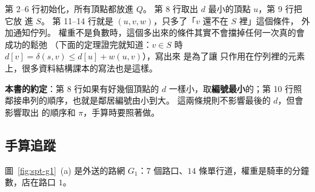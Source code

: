 第 2--6 行初始化，所有頂點都放進 $Q$。 第 8 行取出 $d$ 最小的頂點 $u$，第 9 行把它放
進 $S$。 第 11--14 行就是 $(u, v, w)$，只多了「$v$ 還不在 $S$ 裡」這個條件，
外加通知佇列。 權重不是負數時，這個多出來的條件其實不會擋掉任何一次真的會成功的鬆弛
（下面的定理證完就知道：$v \in S$ 時 $d[v] = \delta(s, v) \le d[u] + w(u, v)$），寫出來
是為了讓  只作用在佇列裡的元素上，很多資料結構課本的寫法也是這樣。

\textbf{本書的約定}：第 8 行如果有好幾個頂點的 $d$ 一樣小，取\textbf{編號最小}的；第 10
行照鄰接串列的順序，也就是鄰居編號由小到大。 這兩條規則不影響最後的 $d$，但會影響取出
的順序和 $\pi$，手算時要照著做。

\subsection{手算追蹤}
\label{sec:spt-dijkstra-trace}

圖~\ref{fig:spt-g1}~(a) 是外送的路網 $G_1$：$7$ 個路口、$14$ 條單行道，權重是騎車的分鐘
數，店在路口 $1$。

